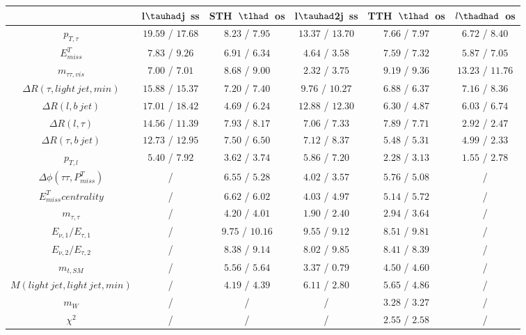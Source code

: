 \centering
\begin{tabular}{|c|c|c|c|c|c|} \hline
 & l$\tauhad$j~ss & STH~$\tlhad$~os & l$\tauhad$2j~ss & TTH~$\tlhad$~os & $l\thadhad$~os\\\hline
$p_{T,\tau }$ & $19.59$ / $17.68$ & $8.23$ / $7.95$ & $13.37$ / $13.70$ & $7.66$ / $7.97$ & $6.72$ / $8.40$\\\hline
$E^{T}_{miss}$ & $7.83$ / $9.26$ & $6.91$ / $6.34$ & $4.64$ / $3.58$ & $7.59$ / $7.32$ & $5.87$ / $7.05$\\\hline
$m_{\tau \tau ,vis}$ & $7.00$ / $7.01$ & $8.68$ / $9.00$ & $2.32$ / $3.75$ & $9.19$ / $9.36$ & $13.23$ / $11.76$\\\hline
$\Delta R(\tau ,light~jet,min)$ & $15.88$ / $15.37$ & $7.20$ / $7.40$ & $9.76$ / $10.27$ & $6.88$ / $6.37$ & $7.16$ / $8.36$\\\hline
$\Delta R(l,b~jet)$ & $17.01$ / $18.42$ & $4.69$ / $6.24$ & $12.88$ / $12.30$ & $6.30$ / $4.87$ & $6.03$ / $6.74$\\\hline
$\Delta R(l,\tau )$ & $14.56$ / $11.39$ & $7.93$ / $8.17$ & $7.06$ / $7.33$ & $7.89$ / $7.71$ & $2.92$ / $2.47$\\\hline
$\Delta R(\tau ,b~jet)$ & $12.73$ / $12.95$ & $7.50$ / $6.50$ & $7.12$ / $8.37$ & $5.48$ / $5.31$ & $4.99$ / $2.33$\\\hline
$p_{T,l}$ & $5.40$ / $7.92$ & $3.62$ / $3.74$ & $5.86$ / $7.20$ & $2.28$ / $3.13$ & $1.55$ / $2.78$\\\hline
$\Delta\phi(\tau \tau ,P^{T}_{miss})$ &  / & $6.55$ / $5.28$ & $4.02$ / $3.57$ & $5.76$ / $5.08$ &  /\\\hline
$E^{T}_{miss} centrality$ &  / & $6.62$ / $6.02$ & $4.03$ / $4.97$ & $5.14$ / $5.72$ &  /\\\hline
$m_{\tau ,\tau }$ &  / & $4.20$ / $4.01$ & $1.90$ / $2.40$ & $2.94$ / $3.64$ &  /\\\hline
$E_{\nu,1}/E_{\tau ,1}$ &  / & $9.75$ / $10.16$ & $9.55$ / $9.12$ & $8.51$ / $9.81$ &  /\\\hline
$E_{\nu,2}/E_{\tau ,2}$ &  / & $8.38$ / $9.14$ & $8.02$ / $9.85$ & $8.41$ / $8.39$ &  /\\\hline
$m_{t,SM}$ &  / & $5.56$ / $5.64$ & $3.37$ / $0.79$ & $4.50$ / $4.60$ &  /\\\hline
$M(light~jet,light~jet,min)$ &  / & $4.19$ / $4.39$ & $6.11$ / $2.80$ & $5.65$ / $4.86$ &  /\\\hline
$m_{W}$ &  / &  / &  / & $3.28$ / $3.27$ &  /\\\hline
$\chi^{2}$ &  / &  / &  / & $2.55$ / $2.58$ &  /\\\hline

\end{tabular}
